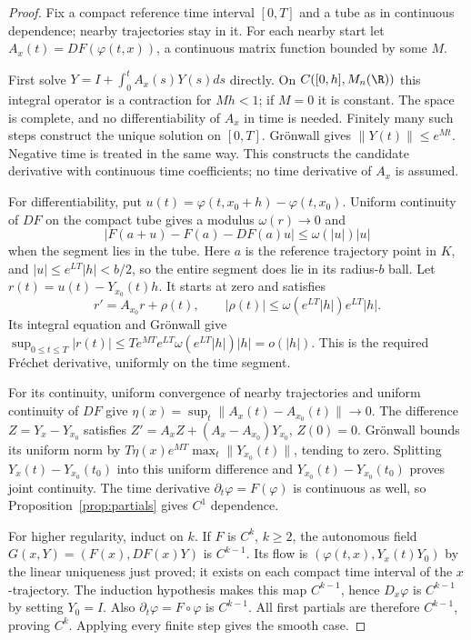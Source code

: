 \begin{proof}
Fix a compact reference time interval $[0,T]$ and a tube as in continuous dependence; nearby trajectories stay in it. For each nearby start let $A_x(t)=DF(\varphi(t,x))$, a continuous matrix function bounded by some $M$.

First solve $Y=I+\int_0^t A_x(s)Y(s)ds$ directly. On $C([0,h],M_n(\R))$ this integral operator is a contraction for $Mh<1$; if $M=0$ it is constant. The space is complete, and no differentiability of $A_x$ in time is needed. Finitely many such steps construct the unique solution on $[0,T]$. Gr\"onwall gives $\|Y(t)\|\le e^{Mt}$. Negative time is treated in the same way. This constructs the candidate derivative with continuous time coefficients; no time derivative of $A_x$ is assumed.

For differentiability, put $u(t)=\varphi(t,x_0+h)-\varphi(t,x_0)$. Uniform continuity of $DF$ on the compact tube gives a modulus $\omega(r)\to0$ and
\[
|F(a+u)-F(a)-DF(a)u|\le\omega(|u|)|u|
\]
when the segment lies in the tube. Here $a$ is the reference trajectory point in $K$, and $|u|\le e^{LT}|h|<b/2$, so the entire segment does lie in its radius-$b$ ball. Let $r(t)=u(t)-Y_{x_0}(t)h$. It starts at zero and satisfies
\[
r'=A_{x_0}r+\rho(t),\qquad
|\rho(t)|\le\omega(e^{LT}|h|)e^{LT}|h|.
\]
Its integral equation and Gr\"onwall give
$\sup_{0\le t\le T}|r(t)|\le Te^{MT}e^{LT}\omega(e^{LT}|h|)|h|=o(|h|)$.
This is the required Fr\'echet derivative, uniformly on the time segment.

For its continuity, uniform convergence of nearby trajectories and uniform continuity of $DF$ give $\eta(x)=\sup_t\|A_x(t)-A_{x_0}(t)\|\to0$. The difference $Z=Y_x-Y_{x_0}$ satisfies
$Z'=A_xZ+(A_x-A_{x_0})Y_{x_0}$, $Z(0)=0$.
Gr\"onwall bounds its uniform norm by $T\eta(x)e^{MT}\max_t\|Y_{x_0}(t)\|$, tending to zero. Splitting $Y_x(t)-Y_{x_0}(t_0)$ into this uniform difference and $Y_{x_0}(t)-Y_{x_0}(t_0)$ proves joint continuity. The time derivative $\partial_t\varphi=F(\varphi)$ is continuous as well, so Proposition~\ref{prop:partials} gives $C^1$ dependence.

For higher regularity, induct on $k$. If $F$ is $C^k$, $k\ge2$, the autonomous field $G(x,Y)=(F(x),DF(x)Y)$ is $C^{k-1}$. Its flow is $(\varphi(t,x),Y_x(t)Y_0)$ by the linear uniqueness just proved; it exists on each compact time interval of the $x$-trajectory. The induction hypothesis makes this map $C^{k-1}$, hence $D_x\varphi$ is $C^{k-1}$ by setting $Y_0=I$. Also $\partial_t\varphi=F\circ\varphi$ is $C^{k-1}$. All first partials are therefore $C^{k-1}$, proving $C^k$. Applying every finite step gives the smooth case.
\end{proof}


